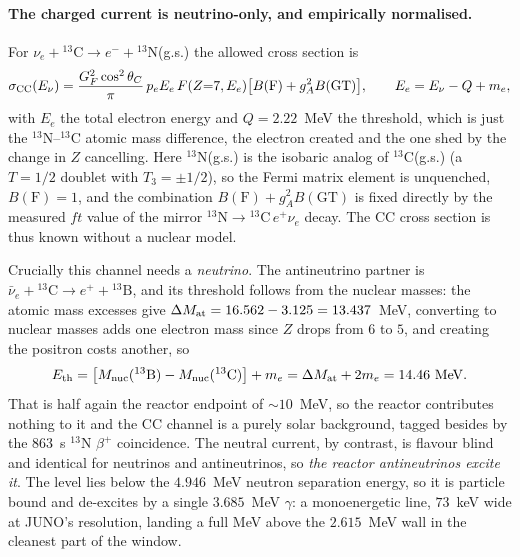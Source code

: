 \documentclass[aps,prd,superscriptaddress,nofootinbib,longbibliography,notitlepage,11pt]{revtex4-2}
\begin{document}
\paragraph{The charged current is neutrino-only, and empirically normalised.}
For $\nu_e+{}^{13}\mathrm{C}\to e^-+{}^{13}\mathrm{N}$(g.s.) the allowed cross section is
\begin{equation}
\sigma_{\rm CC}(E_\nu)=\frac{G_F^2\cos^2\theta_C}{\pi}\,p_eE_e\,F(Z{=}7,E_e)
\big[B(\mathrm{F})+g_A^2B(\mathrm{GT})\big],\qquad E_e=E_\nu-Q+m_e,
\label{eq:sigcc}
\end{equation}
with $E_e$ the total electron energy and $Q=2.22$~MeV the threshold, which is just the
$^{13}$N--$^{13}$C atomic mass difference, the electron created and the one shed by the
change in $Z$ cancelling.  Here $^{13}$N(g.s.) is the isobaric analog of $^{13}$C(g.s.) (a $T=1/2$
doublet with $T_3=\pm1/2$), so the Fermi matrix element is unquenched, $B(\mathrm{F})=1$,
and the combination $B(\mathrm{F})+g_A^2B(\mathrm{GT})$ is fixed directly by the measured
$ft$ value of the mirror $^{13}\mathrm{N}\to{}^{13}\mathrm{C}\,e^+\nu_e$ decay.  The CC
cross section is thus known without a nuclear model.

Crucially this channel needs a \emph{neutrino}.  The antineutrino partner is
$\bar\nu_e+{}^{13}\mathrm{C}\to e^++{}^{13}\mathrm{B}$, and its threshold follows from the
nuclear masses: the atomic mass excesses give
$\Delta M_{\rm at}=16.562-3.125=13.437$~MeV, converting to nuclear masses adds one electron
mass since $Z$ drops from $6$ to $5$, and creating the positron costs another, so
\begin{equation}
E_{\rm th}=\big[M_{\rm nuc}({}^{13}\mathrm{B})-M_{\rm nuc}({}^{13}\mathrm{C})\big]+m_e
=\Delta M_{\rm at}+2m_e=14.46\ \mathrm{MeV}.
\label{eq:13Bthreshold}
\end{equation}
That is half again the reactor endpoint of $\sim10$~MeV, so the reactor contributes nothing
to it and the CC channel is a purely solar background, tagged besides by the $863$~s
$^{13}$N $\beta^+$ coincidence.
The neutral current, by contrast, is flavour blind and identical for neutrinos and
antineutrinos, so \emph{the reactor antineutrinos excite it}.  The level lies below the
$4.946$~MeV neutron separation energy, so it is particle bound and de-excites by a single
$3.685$~MeV $\gamma$: a monoenergetic line, $73$~keV wide at JUNO's resolution, landing a
full MeV above the $2.615$~MeV wall in the cleanest part of the window.
\end{document}
